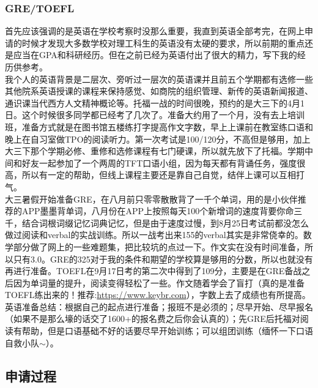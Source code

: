 \documentclass[a4paper,UTF8]{book}
\begin{document}
        \subsubsection*{GRE/TOEFL}
        首先应该强调的是英语在学校考察时没那么重要，我直到英语全部考完，在网上申请的时候才发现大多数学校对理工科生的英语没有太硬的要求，所以前期的重点还是应当在GPA和科研经历。但在之前已经为英语付出了很大的精力，写下我的经历供参考。\\
        我个人的英语背景是二层次、旁听过一层次的英语课并且前五个学期都有选修一些其他院系英语授课的课程来保持感觉、如商院的组织管理、新传的英语新闻报道、通识课当代西方人文精神概论等。托福一战的时间很晚，预约的是大三下的4月1日。这个时候很多同学都已经考了几次了。准备大约用了一个月，没有去上培训班，准备方式就是在图书馆五楼练打字提高作文字数，早上上课前在教室练口语和晚上在自习室做TPO的阅读听力。第一次考试是100/120分，不高但是够用，加上大三下那个学期必修、重修和选修课程有七门硬课，所以就先放下了托福。学期中间和好友一起参加了一个两周的TFT口语小组，因为每天都有背诵任务，强度很高，所以有一定的帮助，但线上课程主要还是靠自己自觉，结伴上课可以互相打气。\\
        大三暑假开始准备GRE，在八月前只零零散散背了一千个单词，用的是小伙伴推荐的APP墨墨背单词，八月份在APP上按照每天100个新增词的速度背要你命三千，结合词根词缀记忆词典记忆，但是由于速度过慢，到8月25日考试前都没怎么做过阅读和verbal的实战训练。所以一战考出来155的verbal其实是非常侥幸的。数学部分做了网上的一些难题集，把比较坑的点过一下。作文实在没有时间准备，所以只有3.0。GRE的325对于我的条件和期望的学校算是够用的分数，所以也就没有再进行准备。TOEFL在9月17日考的第二次中得到了109分，主要是在GRE备战之后因为单词量的提升，阅读变得轻松了一些。作文随着学会了盲打（真的是准备TOEFL练出来的！推荐:\url{https://www.keybr.com}），字数上去了成绩也有所提高。\\
        英语准备总结：根据自己的起点进行准备；报班不是必须的；尽早开始、尽早报名（如果不是那么壕的话交了1600+的报名费之后你会认真的）；先GRE后托福对阅读有帮助，但是口语基础不好的话要尽早开始训练；可以组团训练（缅怀一下口语自救小队$\sim$）。

    \subsection*{申请过程}
\end{document}
